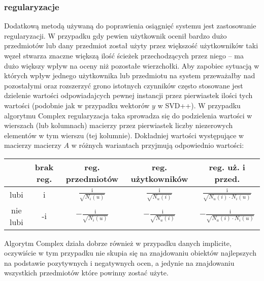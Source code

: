 \documentclass{pracamgr}
\begin{document}
    \subsubsection{regularyzacje}
     Dodatkową metodą używaną do poprawienia osiągnięć systemu jest zastosowanie regularyzacji.
     W przypadku gdy pewien użytkownik ocenił bardzo dużo przedmiotów lub dany przedmiot został użyty przez większość użytkowników taki węzeł
     stwarza znaczne większą ilość ścieżek przechodzących przez niego -- ma dużo większy wpływ na oceny niż pozostałe wierzchołki.
     Aby zapobiec sytuacją w których wpływ jednego użytkownika lub przedmiotu na system przeważałby nad pozostałymi oraz rozszerzyć
     grono istotnych czynników często stosowane jest dzielenie wartości odpowiadajcych pewnej instancji przez pierwiastek ilości tych wartości
     (podobnie jak w przypadku wektorów $y$ w SVD++).
     W przypadku algorytmu Complex regularyzacja taka sprowadza się do podzielenia wartości w wierszach (lub kolumnach) macierzy przez pierwiastek liczby
     niezerowych elementów w tym wierszu (tej kolumnie). Dokładniej wartości występujące w macierzy macierzy $A$ w różnych wariantach przyjmują odpowiednio
     wartości:
     \begin{center}
      \begin{tabular}{|c|c|c|c|c|}
       \hline
         & brak reg. & reg. przedmiotów & reg. użytkowników & reg. uż. i przed. \\
       \hline
        lubi & i &  $\frac{\text{i}}{\sqrt{N_{i}(u)}}$& $\frac{\text{i}}{\sqrt{N_{u}(i)}}$ & $\frac{\text{i}}{\sqrt{N_{u}(i)\cdot N_{i}(u)}}$  \\
       \hline
        nie lubi & -i & $-\frac{\text{i}}{\sqrt{N_{i}(u)}}$ &  $-\frac{\text{i}}{\sqrt{N_{u}(i)}}$ & $-\frac{\text{i}}{\sqrt{N_{u}(i)\cdot N_{i}(u)}}$  \\    
       \hline
      \end{tabular}
     \end{center}
     \vspace{16pt}
     Algorytm Complex działa dobrze również w przypadku danych implicite, oczywiście w tym przypadku nie skupia się na znajdowaniu obiektów najlepszych
     na podstawie pozytywnych i negatywnych ocen, a jedynie na znajdowaniu wszystkich przedmiotów które powinny zostać użyte.\newpage
    
    
    
    
\end{document}
